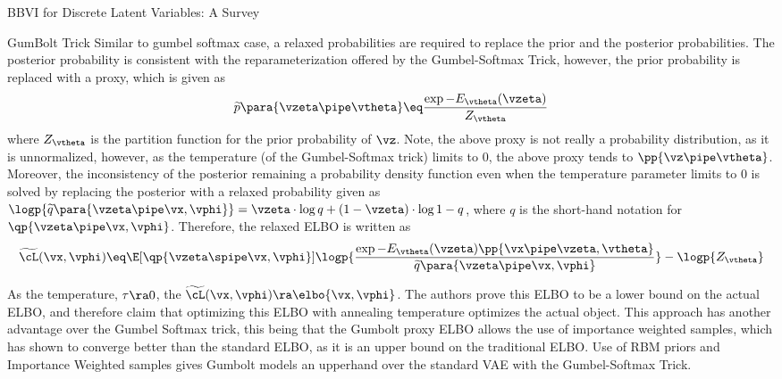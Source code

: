 \documentclass{article}
\begin{document}
\begin{psection}{BBVI for Discrete Latent Variables: A Survey}
\begin{psubsection}{GumBolt Trick}
		Similar to gumbel softmax case, a relaxed probabilities are required to replace the prior and the posterior probabilities. The posterior probability is consistent with the reparameterization offered by the Gumbel-Softmax Trick, however, the prior probability is replaced with a proxy, which is given as
		\begin{align}
			\widetilde{p}\para{\vzeta \pipe \vtheta} \eq \frac{\exp{-E_\vtheta(\vzeta)}}{Z_\vtheta}
			\label{eq:gumbolt-prob-proxy}
		\end{align}
		where $Z_\vtheta$ is the partition function for the prior probability of $\vz$. Note, the above proxy is not really a probability distribution, as it is unnormalized, however, as the temperature (of the Gumbel-Softmax trick) limits to 0, the above proxy tends to $\pp{\vz \pipe \vtheta}$. Moreover, the inconsistency of the posterior remaining a probability density function even when the temperature parameter limits to 0 is solved by replacing the posterior with a relaxed probability given as $\logp{\widetilde{q}\para{\vzeta \pipe \vx, \vphi}} = \vzeta \cdot \log{q} + (1 - \vzeta) \cdot \log{1 - q}$, where $q$ is the short-hand notation for $\qp{\vzeta \pipe \vx, \vphi}$. Therefore, the relaxed ELBO is written as
		\begin{align}
			\widetilde{\cL}(\vx, \vphi) \eq \E[\qp{\vzeta \spipe \vx, \vphi}]{\logp{\frac{\exp{-E_\vtheta(\vzeta)} \pp{\vx \pipe \vzeta, \vtheta}}{\widetilde{q}\para{\vzeta \pipe \vx, \vphi}}}} - \logp{Z_\vtheta}
			\label{eq:gumbolt-elbo}
		\end{align}

		As the temperature, $\tau \ra 0$, the $\widetilde{\cL}(\vx, \vphi) \ra \elbo{\vx, \vphi}$. The authors prove this ELBO to be a lower bound on the actual ELBO, and therefore claim that optimizing this ELBO with annealing temperature optimizes the actual object. This approach has another advantage over the Gumbel Softmax trick, this being that the Gumbolt proxy ELBO allows the use of importance weighted samples, which has shown to converge better than the standard ELBO, as it is an upper bound on the traditional ELBO. Use of RBM priors and Importance Weighted samples gives Gumbolt models an upperhand over the standard VAE with the Gumbel-Softmax Trick.

	\end{psubsection}
\end{psection}
\end{document}
